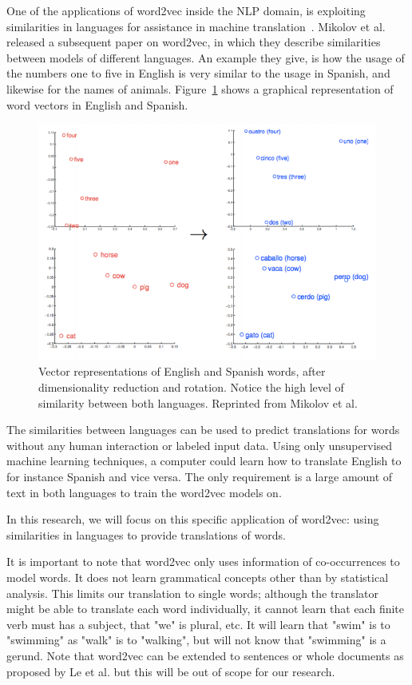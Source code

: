 One of the applications of word2vec inside the NLP domain, is exploiting similarities in languages for assistance in machine translation~\cite{wolf2014joint}. Mikolov et al.~\cite{mikolov2013exploiting} released a subsequent paper on word2vec, in which they describe similarities between models of different languages. An example they give, is how the usage of the numbers one to five in English is very similar to the usage in Spanish, and likewise for the names of animals. Figure~\ref{fig:english_spanish} shows a graphical representation of word vectors in English and Spanish.

\begin{figure}[ht!]
  \centering \includegraphics[width=\linewidth]{images/english_spanish}
  \caption{Vector representations of English and Spanish words, after dimensionality reduction and rotation. Notice the high level of similarity between both languages. Reprinted from Mikolov et al.~\cite{mikolov2013exploiting}}
  \label{fig:english_spanish}
\end{figure}

The similarities between languages can be used to predict translations for words without any human interaction or labeled input data. Using only unsupervised machine learning techniques, a computer could learn how to translate English to for instance Spanish and vice versa. The only requirement is a large amount of text in both languages to train the word2vec models on.

In this research, we will focus on this specific application of word2vec: using similarities in languages to provide translations of words.

It is important to note that word2vec only uses information of co-occurrences to model words. It does not learn grammatical concepts other than by statistical analysis. This limits our translation to single words; although the translator might be able to translate each word individually, it cannot learn that each finite verb must has a subject, that "we" is plural, etc. It will learn that "swim" is to "swimming" as "walk" is to "walking", but will not know that "swimming" is a gerund. Note that word2vec can be extended to sentences or whole documents as proposed by Le et al. \cite{le2014distributed} but this will be out of scope for our research.

